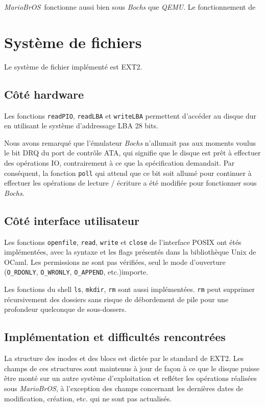 \documentclass[a4paper, 10pt, french]{article}
\newcommand{\foreign}[1]{\emph{#1}}
\newcommand{\mariobros}{\foreign{MarioBrOS}}
\begin{document}
\mariobros\ fonctionne aussi bien sous \foreign{Bochs} que \foreign{QEMU}. Le fonctionnement de


\section{Système de fichiers}

	Le système de fichier implémenté est EXT2.
	
	\subsection{Côté hardware}
	
		Les fonctions \verb|readPIO|, \verb|readLBA| et \verb|writeLBA| permettent d'accéder au disque dur en utilisant le système d'addressage LBA 28 bits.
		
		Nous avons remarqué que l'émulateur \foreign{Bochs} n'allumait pas aux moments voulus le bit DRQ du port de contrôle ATA, qui signifie que le disque est prêt à effectuer des opérations IO, contrairement à ce que la spécification demandait. Par conséquent, la fonction \verb|poll| qui attend que ce bit soit allumé pour continuer à effectuer les opérations de lecture / écriture a été modifiée pour fonctionner sous \foreign{Bochs}.
	
	\subsection{Côté interface utilisateur}
	
		Les fonctions \verb|openfile|, \verb|read|, \verb|write| et \verb|close| de l'interface POSIX ont étés implémentées, avec la syntaxe et les flags présentés dans la bibliothèque Unix de OCaml. Les permissions ne sont pas vérifiées, seul le mode d'ouverture (\verb|O_RDONLY|, \verb|O_WRONLY|, \verb|O_APPEND|, etc.)importe.
		
		Les fonctions du shell \verb|ls|, \verb|mkdir|, \verb|rm| sont aussi implémentées. \verb|rm| peut supprimer récursivement des dossiers sans risque de débordement de pile pour une profondeur quelconque de sous-dossers.
		
	\subsection{Implémentation et difficultés rencontrées}
	
		La structure des inodes et des blocs est dictée par le standard de EXT2. Les champs de ces structures sont maintenus à jour de façon à ce que le disque puisse être monté sur un autre système d'exploitation et refléter les opérations réalisées sous \mariobros, à l'exception des champs concernant les dernières dates de modification, création, etc. qui ne sont pas actualisés.
		
\end{document}
